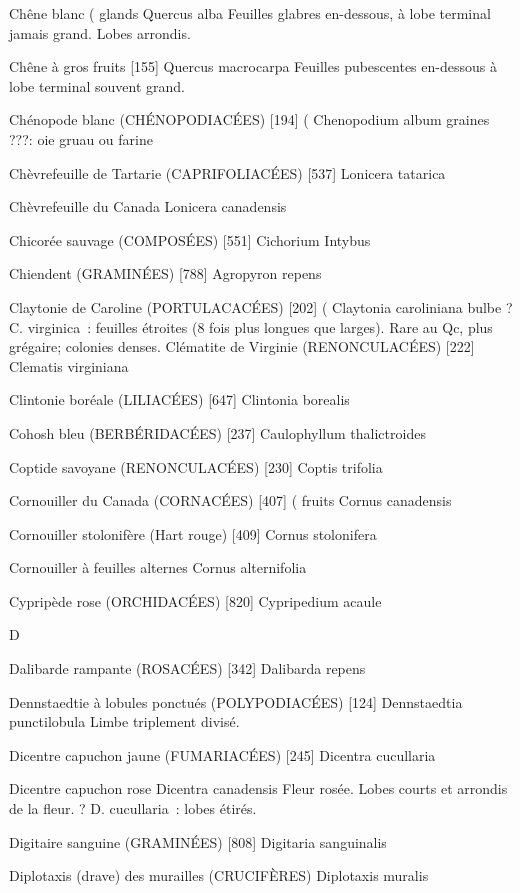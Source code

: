 \documentclass[book,12pt,a4paper,onecolumn,openany]{memoir}
\begin{document}
Chêne blanc							( glands
				Quercus alba
Feuilles glabres en-dessous, à lobe terminal jamais grand. Lobes arrondis.


Chêne à gros fruits  [155]
				Quercus macrocarpa
Feuilles pubescentes en-dessous à lobe terminal souvent grand.

Chénopode blanc (CHÉNOPODIACÉES)  [194]		(
				Chenopodium album			graines
???: oie							gruau ou farine

Chèvrefeuille de Tartarie (CAPRIFOLIACÉES)  [537]
				Lonicera tatarica

Chèvrefeuille du Canada 
				Lonicera canadensis

Chicorée sauvage (COMPOSÉES)  [551]
				Cichorium Intybus

Chiendent (GRAMINÉES)  [788]
				Agropyron repens

Claytonie de Caroline (PORTULACACÉES)  [202]			(
				Claytonia caroliniana			bulbe
? C. virginica : feuilles étroites (8 fois plus longues que larges).
Rare au Qc, plus grégaire; colonies denses.
Clématite de Virginie (RENONCULACÉES)  [222]
				Clematis virginiana

Clintonie boréale (LILIACÉES)  [647]
				Clintonia borealis

Cohosh bleu (BERBÉRIDACÉES)  [237]
				Caulophyllum thalictroides

Coptide savoyane (RENONCULACÉES)  [230]
				Coptis trifolia

Cornouiller du Canada (CORNACÉES)  [407]			( fruits
				Cornus canadensis

Cornouiller stolonifère (Hart rouge)  [409]
				Cornus stolonifera

Cornouiller à feuilles alternes
				Cornus alternifolia

Cypripède rose (ORCHIDACÉES)  [820]
				Cypripedium acaule

D

Dalibarde rampante (ROSACÉES)  [342]
				Dalibarda repens

Dennstaedtie à lobules ponctués (POLYPODIACÉES) [124]
				Dennstaedtia punctilobula
Limbe triplement divisé.

Dicentre capuchon jaune (FUMARIACÉES)  [245]
				Dicentra cucullaria

Dicentre capuchon rose
				Dicentra canadensis
Fleur rosée. Lobes courts et arrondis de la fleur. ? D. cucullaria : lobes étirés.

Digitaire sanguine (GRAMINÉES)  [808]
				Digitaria sanguinalis

Diplotaxis (drave) des murailles  (CRUCIFÈRES)
				Diplotaxis muralis
\end{document}
